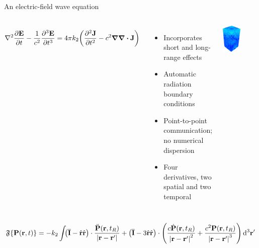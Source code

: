 \documentclass[aspectratio=169, usenames, dvipsnames]{beamer}
\begin{document}
\begin{frame}{An electric-field wave equation}
  \vspace{0.7cm}
  \begin{columns}
        \begin{equation*}
          \laplacian{\pdv{\vb{E}}{t}} - \frac{1}{c^2} \pdv[3]{\vb{E}}{t} = 4 \pi k_2 \qty(\pdv[2]{\vb{J}}{t} - c^2 \grad \div \vb{J})
        \end{equation*}
        \begin{itemize}
          \item Incorporates short and long-range effects
          \item Automatic radiation boundary conditions
          \item Point-to-point communication; no numerical dispersion
          \item \alert{Four} derivatives, two spatial and two temporal
        \end{itemize}

      \centering
      \includegraphics[width=0.5\textwidth]{figures/dipoles_2.png}
  \end{columns}

  \begin{equation*}
    \mathfrak{F}\qty{\vb{P}(\vb{r}, t)} = -k_2 \int_{}
        \left(\overline{\mathbf{I}} -  \hat{\mathbf{r}}\hat{\mathbf{r}}\right) \cdot \frac{\ddot{\mathbf{P}}(\vb{r}, t_R)}{\left|\mathbf{r}-\mathbf{r}'\right|} +
        \left(\overline{\mathbf{I}} - 3\hat{\mathbf{r}}\hat{\mathbf{r}}\right) \cdot \qty(
          \frac{c\dot{\mathbf{P}}(\vb{r}, t_R)}{\left|\mathbf{r}-\mathbf{r}'\right|^2} +
          \frac{c^2   \mathbf{P}(\vb{r}, t_R)}{\left|\mathbf{r}-\mathbf{r}'\right|^3}
        )
      \, \mathrm{d}^3 \mathbf{r'}
  \end{equation*}
\end{frame}
\end{document}
